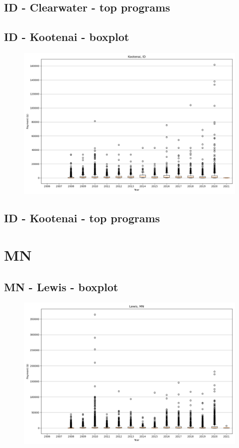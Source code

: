 \subsection*{ID - Clearwater - top programs}

\newpage
\subsection*{ID - Kootenai - boxplot}
\begin{figure}[h]
\centering
\includegraphics[width=7in]{../output/boxplots/counties/Kootenai-ID_boxplot.png}
\end{figure}


\subsection*{ID - Kootenai - top programs}

\newpage
\section*{MN}
\subsection*{MN - Lewis - boxplot}
\begin{figure}[h]
\centering
\includegraphics[width=7in]{../output/boxplots/counties/Lewis-MN_boxplot.png}
\end{figure}


